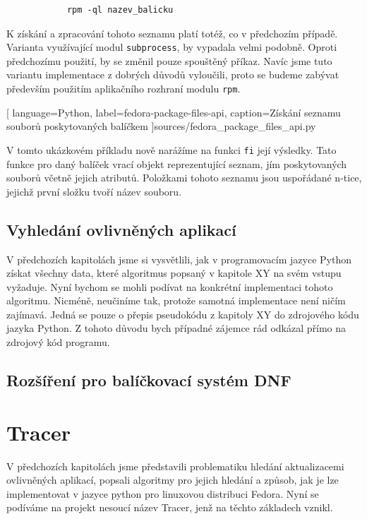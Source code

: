 \documentclass[
  field=inf,
  biblatex,
  glossaries,
  index
]{kidiplom}
\begin{document}
		\begin{lstlisting}
			rpm -ql nazev_balicku
		\end{lstlisting}

		K získání a zpracování tohoto seznamu platí totéž, co v předchozím případě. Varianta využívající modul \texttt{subprocess}, by vypadala velmi podobně. Oproti předchozímu použití, by se změnil pouze spouštěný příkaz. Navíc jsme tuto variantu implementace z dobrých důvodů vyloučili, proto se budeme zabývat především použitím aplikačního rozhraní modulu \texttt{rpm}.

		
		[
			language=Python,
			label=fedora-package-files-api,
			caption={Získání seznamu souborů poskytovaných balíčkem}
		]{sources/fedora_package_files_api.py}

		V tomto ukázkovém příkladu nově narážíme na funkci \texttt{fi} její výsledky. Tato funkce pro daný balíček vrací objekt reprezentující seznam, jím poskytovaných souborů včetně jejich atributů. Položkami tohoto seznamu jsou uspořádané n-tice, jejichž první složku tvoří název souboru.

	\subsection{Vyhledání ovlivněných aplikací}
		V předchozích kapitolách jsme si vysvětlili, jak v programovacím jazyce Python získat všechny data, které algoritmus popsaný v kapitole XY na svém vstupu vyžaduje. Nyní bychom se mohli podívat na konkrétní implementaci tohoto algoritmu. Nicméně, neučiníme tak, protože samotná implementace není ničím zajímavá. Jedná se pouze o přepis pseudokódu z kapitoly XY do zdrojového kódu jazyka Python. Z tohoto důvodu bych případné zájemce rád odkázal přímo na zdrojový kód programu.

	\subsection{Rozšíření pro balíčkovací systém DNF}
\newpage
\section{Tracer}
	V předchozích kapitolách jsme představili problematiku hledání aktualizacemi ovlivněných aplikací, popsali algoritmy pro jejich hledání a způsob, jak je lze implementovat v jazyce python pro linuxovou distribuci Fedora. Nyní se podíváme na projekt nesoucí název Tracer, jenž na těchto základech vznikl.
\end{document}
